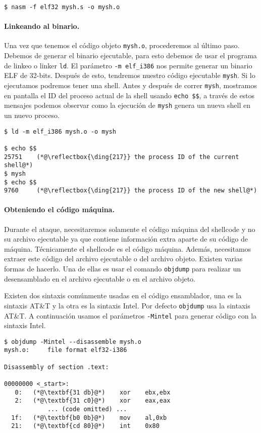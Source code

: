 \begin{lstlisting}
$ nasm -f elf32 mysh.s -o mysh.o
\end{lstlisting}


\paragraph{Linkeando al binario.}
Una vez que tenemos el código objeto \texttt{mysh.o}, procederemos al último paso. Debemos de generar el binario ejecutable, para esto debemos de usar el programa de linkeo o linker \texttt{ld}. El parámetro \texttt{-m elf\_i386} nos permite generar un binario ELF de 32-bits.
Después de esto, tendremos nuestro código ejecutable \texttt{mysh}. Si lo ejecutamos podremos tener una shell.
Antes y después de correr \texttt{mysh}, mostramos en pantalla el ID del proceso actual de la shell usando \texttt{echo \$\$}, a través de estos mensajes podemos observar como la ejecución de \texttt{mysh} genera un nueva shell en un nuevo proceso.

\begin{lstlisting}
$ ld -m elf_i386 mysh.o -o mysh

$ echo $$
25751    (*@\reflectbox{\ding{217}} the process ID of the current shell@*)
$ mysh
$ echo $$
9760     (*@\reflectbox{\ding{217}} the process ID of the new shell@*)
\end{lstlisting}



\paragraph{Obteniendo el código máquina.}
Durante el ataque, necesitaremos solamente el código máquina del shellcode y no su archivo ejecutable ya que contiene información extra aparte de su código de máquina. 
Técnicamente el shellcode es el código máquina.
Además, necesitamos extraer este código del archivo ejecutable o del archivo objeto. Existen varias formas de hacerlo. Una de ellas es usar el comando \texttt{objdump} para realizar un desensamblado en el archivo ejecutable o en el archivo objeto.

Existen dos sintaxis comúnmente usadas en el código ensamblador, una es la sintaxis AT\&T y la otra es la sintaxis Intel. Por defecto \texttt{objdump} usa la sintaxis AT\&T. A continuación usamos el parámetros \texttt{-Mintel} para generar código con la sintaxis Intel.

\begin{lstlisting}
$ objdump -Mintel --disassemble mysh.o
mysh.o:     file format elf32-i386

Disassembly of section .text:

00000000 <_start>:
   0:	(*@\textbf{31 db}@*)    xor    ebx,ebx
   2:	(*@\textbf{31 c0}@*)    xor    eax,eax
            ... (code omitted) ...
  1f:	(*@\textbf{b0 0b}@*)    mov    al,0xb
  21:	(*@\textbf{cd 80}@*)    int    0x80
\end{lstlisting}
 
